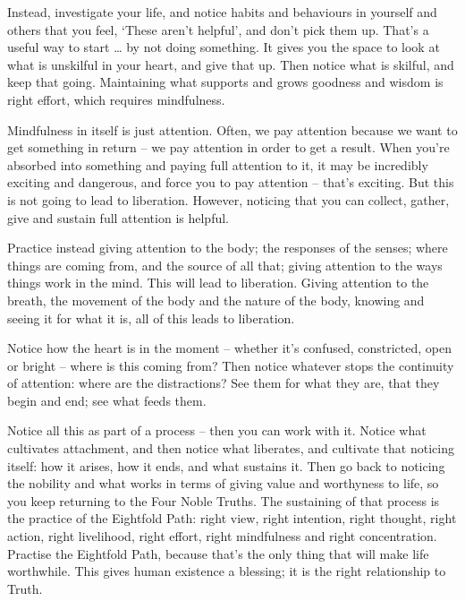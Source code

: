 Instead, investigate your life, and notice habits and
behaviours in yourself and others that you feel, `These aren't helpful',
and don't pick them up. That's a useful way to start \ldots{} by not doing
something. It gives you the space to look at what is unskilful in your heart,
and give that up. Then notice what is skilful, and keep that going. Maintaining
what supports and grows goodness and wisdom is right effort, which requires mindfulness.

Mindfulness in itself is just attention. Often, we pay attention because we want to get something in return -- we pay
attention in order to get a result. When you're absorbed into something and
paying full attention to it, it may be incredibly exciting and dangerous, and force
you to pay attention -- that's exciting. But this is not going to lead to
liberation. However, noticing that you can collect, gather, give and sustain full attention is helpful. 

Practice instead giving attention to the body; the responses of the senses;
where things are coming from, and the source of all that; giving attention to the
ways things work in the mind. This will lead to liberation. Giving attention to
the breath, the movement of the body and the nature of the body, knowing and
seeing it for what it is, all of this leads to liberation.

Notice how the heart is in the moment -- whether it's confused, constricted,
open or bright -- where is this coming from? Then notice whatever stops
the continuity of attention: where are the distractions? See them for what they
are, that they begin and end; see what feeds them.

Notice all this as part of a process -- then you can work with it. Notice what
cultivates attachment, and then notice what liberates, and cultivate that
noticing itself: how it arises, how it ends, and what sustains it. Then go back
to noticing the nobility and what works in terms of giving value and worthyness to life, so you keep
returning to the Four Noble Truths. The sustaining of that process is the practice of the
Eightfold Path: right view, right intention, right thought, right action, right
livelihood, right effort, right mindfulness and right concentration. Practise
the Eightfold Path, because that's the only thing that will make life
worthwhile. This gives human existence a blessing; it is the right relationship
to Truth.

\enlargethispage{\baselineskip}

